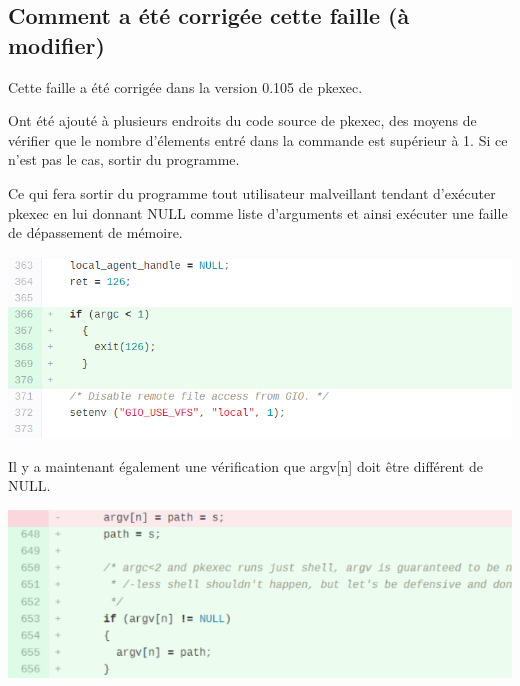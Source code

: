 \documentclass[12pt,a4paper]{article}
\begin{document}
		\subsection{Comment a été corrigée cette faille (à modifier)}
            \begin{flushleft}
                \noindent Cette faille a été corrigée dans la version 0.105 de pkexec.
                \item Ont été ajouté à plusieurs endroits du code source de pkexec, des moyens de vérifier que le nombre d'élements entré dans la commande est supérieur à 1. Si ce n'est pas le cas, sortir du programme. 
                \item Ce qui fera sortir du programme tout utilisateur malveillant tendant d'exécuter pkexec en lui donnant NULL comme liste d'arguments et ainsi exécuter une faille de dépassement de mémoire. \cite{pkexeclo25:online} 
                \begin{center}
                    \includegraphics[scale=0.5]{verifargcsize}
                    \cite{securitytrack:online}
                \end{center}
                \item Il y a maintenant également une vérification que argv[n] doit être différent de NULL.
                \begin{center}
                    \includegraphics[scale=0.5]{verifisnull}
                    \cite{securitytrack:online}
                \end{center}
            \end{flushleft}
            
\end{document}
